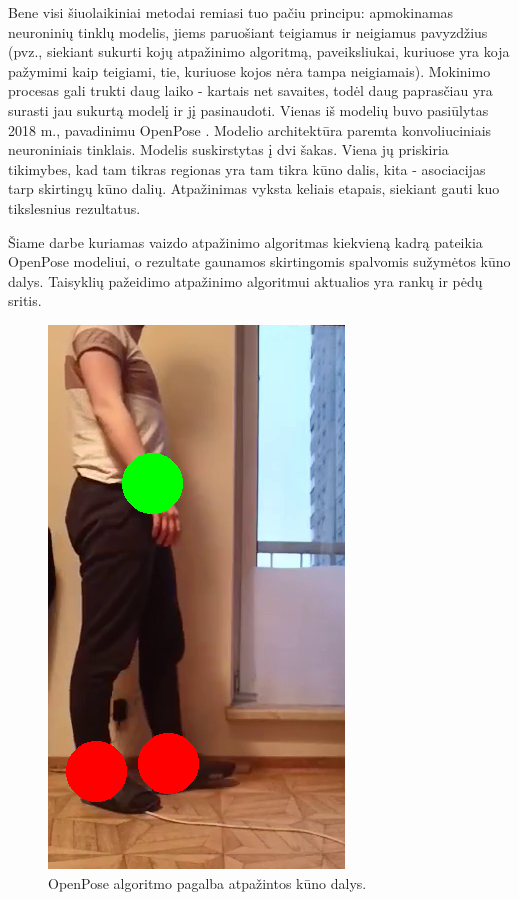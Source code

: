 \documentclass{VUMIFPSbakalaurinis}
\begin{document}
Bene visi šiuolaikiniai metodai remiasi tuo pačiu principu: apmokinamas neuroninių tinklų modelis, jiems paruošiant teigiamus ir neigiamus pavyzdžius (pvz., siekiant sukurti kojų atpažinimo algoritmą, paveiksliukai, kuriuose yra koja pažymimi kaip teigiami, tie, kuriuose kojos nėra tampa neigiamais). Mokinimo procesas gali trukti daug laiko - kartais net savaites, todėl daug paprasčiau yra surasti jau sukurtą modelį ir jį pasinaudoti. Vienas iš modelių buvo pasiūlytas 2018 m., pavadinimu OpenPose \cite{cao2019openpose}. Modelio architektūra paremta konvoliuciniais neuroniniais tinklais. Modelis suskirstytas į dvi šakas. Viena jų priskiria tikimybes, kad tam tikras regionas yra tam tikra kūno dalis, kita - asociacijas tarp skirtingų kūno dalių. Atpažinimas vyksta keliais etapais, siekiant gauti kuo tikslesnius rezultatus. 

Šiame darbe kuriamas vaizdo atpažinimo algoritmas kiekvieną kadrą pateikia OpenPose modeliui, o rezultate gaunamos skirtingomis spalvomis sužymėtos kūno dalys. Taisyklių pažeidimo atpažinimo algoritmui aktualios yra rankų ir pėdų sritis. 

\begin{figure}[H]
    \centering
    \includegraphics[scale=0.8]{img/body-parts}
    \caption{OpenPose algoritmo pagalba atpažintos kūno dalys.}
    \label{img:mlp}
\end{figure}
\end{document}
